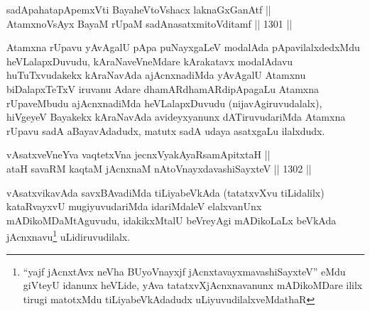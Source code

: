 \begin{shl}
sadA\s pahatapApemxVti BayaheVtoVshacx laknaGxGanAtf ||  \\
AtamxnoV\s sAyx \footnotemark[2]BayaM rUpaM sadA\s nasatxmitoVditamf \hfill || 1301 ||  
\end{shl}

\begin{artha}
Atamxna rUpavu yAvAgalU pApa puNayxgaLeV modalAda pApavilalxdedxMdu heVLalapxDuvudu, kAraNaveVneMdare kArakatavx modalAdavu huTuTxvudakekx kAraNavAda ajAcnxnadiMda yAvAgalU Atamxnu biDalapxTeTxV iruvanu Adare dhamARdhamARdipApagaLu Atamxna rUpaveMbudu ajAcnxnadiMda heVLalapxDuvudu (nijavAgiruvudalalx), hiVgeyeV Bayakekx kAraNavAda avideyxyanunx dATiruvudariMda Atamxna rUpavu sadA aBayavAdadudx, matutx sadA udaya asatxgaLu ilalxdudx.
\end{artha}


\begin{shl}
vAsatxveVneYva vaqtetxVna jecnxVyakAyaRsamApitxtaH || \\
ataH savaRM kaqtaM jAcnxnaM nAtoV\s nayxdavashiSayxteV \hfill || 1302 ||  
\end{shl}

\begin{artha}
vAsatxvikavAda savxBAvadiMda tiLiyabeVkAda (tatatxvXvu tiLidalilx) kataRvayxvU mugiyuvudariMda idariMdaleV elalxvanUnx mADikoMDaMtAguvudu, idakikxMtalU beVreyAgi mADikoLaLx beVkAda jAcnxnavu\footnote{``yajf jAcnxtAvx neVha BUyoV\s nayxjf jAcnxtavayxmavashiSayxteV'' eMdu giVteyU idanunx heVLide, yAva tatatxvXjAcnxnavanunx mADikoMDare ililx tirugi matotxMdu tiLiyabeVkAdadudx uLiyuvudilalxveMdathaR} uLidiruvudilalx.
\end{artha}



